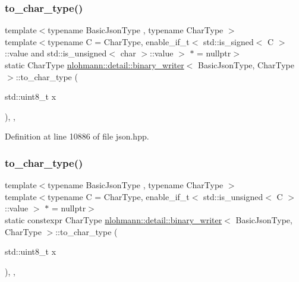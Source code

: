 \subsubsection{\texorpdfstring{to\_char\_type()}{to\_char\_type()}\hspace{0.1cm}{\footnotesize\ttfamily [2/4]}}
{\footnotesize\ttfamily template$<$typename Basic\+Json\+Type , typename Char\+Type $>$ \\
template$<$typename C  = Char\+Type, enable\+\_\+if\+\_\+t$<$ std\+::is\+\_\+signed$<$ C $>$\+::value and std\+::is\+\_\+unsigned$<$ char $>$\+::value $>$ $\ast$  = nullptr$>$ \\
static Char\+Type \mbox{\hyperlink{classnlohmann_1_1detail_1_1binary__writer}{nlohmann\+::detail\+::binary\+\_\+writer}}$<$ Basic\+Json\+Type, Char\+Type $>$\+::to\+\_\+char\+\_\+type (\begin{DoxyParamCaption}\item[{std\+::uint8\+\_\+t}]{x }\end{DoxyParamCaption})\hspace{0.3cm}{\ttfamily [inline]}, {\ttfamily [static]}, {\ttfamily [noexcept]}}



Definition at line 10886 of file json.\+hpp.

\mbox{\label{classnlohmann_1_1detail_1_1binary__writer_ab77aa48692bd4e64e4f051ce6aeb6d2d}} 
\subsubsection{\texorpdfstring{to\_char\_type()}{to\_char\_type()}\hspace{0.1cm}{\footnotesize\ttfamily [3/4]}}
{\footnotesize\ttfamily template$<$typename Basic\+Json\+Type , typename Char\+Type $>$ \\
template$<$typename C  = Char\+Type, enable\+\_\+if\+\_\+t$<$ std\+::is\+\_\+unsigned$<$ C $>$\+::value $>$ $\ast$  = nullptr$>$ \\
static constexpr Char\+Type \mbox{\hyperlink{classnlohmann_1_1detail_1_1binary__writer}{nlohmann\+::detail\+::binary\+\_\+writer}}$<$ Basic\+Json\+Type, Char\+Type $>$\+::to\+\_\+char\+\_\+type (\begin{DoxyParamCaption}\item[{std\+::uint8\+\_\+t}]{x }\end{DoxyParamCaption})\hspace{0.3cm}{\ttfamily [inline]}, {\ttfamily [static]}, {\ttfamily [noexcept]}}



